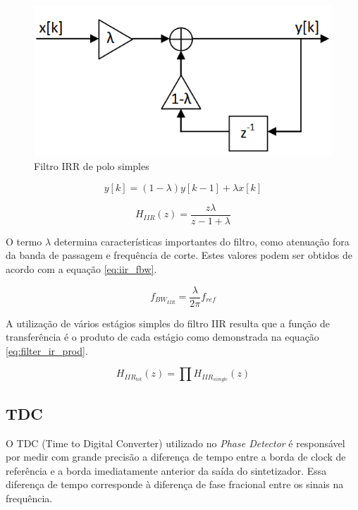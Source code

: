 \begin{figure}[htb]
	\caption{Filtro IRR de polo simples}
	\begin{center}
		\includegraphics[scale=0.8]{img/filter_IRR_time_domain.png}
	\end{center}
	\label{fig:filter_IRR_time_domain}
\end{figure}


 \begin{equation}
	y[k]= (1 - \lambda) y[k-1] + \lambda x[k]
	\label{eq:irr_simple_pole}
\end{equation}

 \begin{equation}
	H_{IIR}(z)= \frac{z \lambda}{z -1 + \lambda}
	\label{eq:irr_tranfer_function}
\end{equation}


O termo $\lambda$ determina características importantes do filtro, como atenuação fora da banda de passagem e frequência de corte. Estes valores podem ser obtidos de acordo com a equação \ref{eq:iir_fbw}.


 \begin{equation}
	f_{BW_{IIR}}= \frac{\lambda}{2 \pi} f_{ref}
	\label{eq:iir_fbw}
\end{equation}

A utilização de vários estágios simples do filtro IIR resulta que a função de transferência é o produto de cada estágio como demonstrada na equação \ref{eq:filter_ir_prod}.

 \begin{equation}
	H_{IIR_{tot}}(z)= \prod 	H_{IIR_{simgle}}(z)
	\label{eq:filter_ir_prod}
\end{equation}

\subsection{TDC}
O TDC (Time to Digital Converter) utilizado no \textit{Phase Detector} é responsável por medir com grande precisão a diferença de tempo entre a borda de clock de referência e a borda imediatamente anterior da saída do sintetizador. Essa diferença de tempo corresponde à diferença de fase fracional entre os sinais na frequência.

